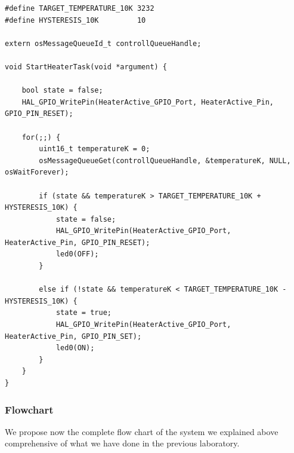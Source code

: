 \documentclass[../main.tex]{subfiles}
\begin{document}
\begin{lstlisting}
#define TARGET_TEMPERATURE_10K 3232 
#define HYSTERESIS_10K         10

extern osMessageQueueId_t controllQueueHandle;

void StartHeaterTask(void *argument) {

    bool state = false;
    HAL_GPIO_WritePin(HeaterActive_GPIO_Port, HeaterActive_Pin, GPIO_PIN_RESET);

    for(;;) {
        uint16_t temperatureK = 0; 
        osMessageQueueGet(controllQueueHandle, &temperatureK, NULL,     		osWaitForever);

        if (state && temperatureK > TARGET_TEMPERATURE_10K + HYSTERESIS_10K) {
            state = false;
            HAL_GPIO_WritePin(HeaterActive_GPIO_Port, HeaterActive_Pin, GPIO_PIN_RESET);
            led0(OFF);
        }
        
        else if (!state && temperatureK < TARGET_TEMPERATURE_10K - HYSTERESIS_10K) {
            state = true;
            HAL_GPIO_WritePin(HeaterActive_GPIO_Port, HeaterActive_Pin, GPIO_PIN_SET);
            led0(ON);
        }
    }
}
\end{lstlisting}


\subsubsection*{Flowchart}

We propose now the complete ﬂow chart of the system we explained above comprehensive of what we have done in the previous laboratory.\\
\end{document}
